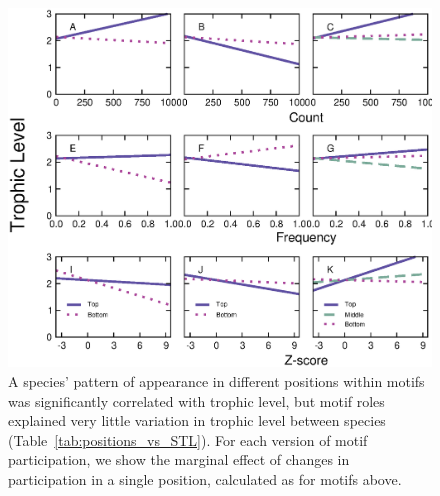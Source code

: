 \documentclass[12pt]{article}
\begin{document}
		    \begin{figure}[ht!]
		        \centering
		        \includegraphics[width=\textwidth]{figures/positions_vs_TL_all.eps}
		        \caption{A species' pattern of appearance in different positions within motifs was significantly correlated with trophic level, but motif roles explained very little variation in trophic level between species (Table~\ref{tab:positions_vs_STL}). For each version of motif participation, we show the marginal effect of changes in participation in a single position, calculated as for motifs above.}
		        \label{fig:positions_TL}
			    \end{figure}
\end{document}
